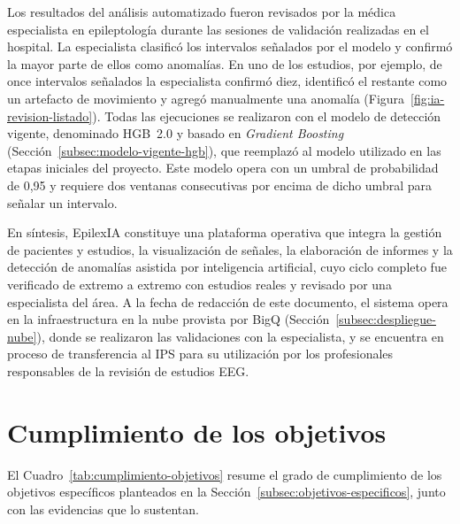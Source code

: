 Los resultados del análisis automatizado fueron revisados por la médica especialista en epileptología durante las sesiones de validación realizadas en el hospital.
La especialista clasificó los intervalos señalados por el modelo y confirmó la mayor parte de ellos como anomalías.
En uno de los estudios, por ejemplo, de once intervalos señalados la especialista confirmó diez, identificó el restante como un artefacto de movimiento y agregó manualmente una anomalía (Figura~\ref{fig:ia-revision-listado}).
Todas las ejecuciones se realizaron con el modelo de detección vigente, denominado HGB~2.0 y basado en \textit{Gradient Boosting} (Sección~\ref{subsec:modelo-vigente-hgb}), que reemplazó al modelo utilizado en las etapas iniciales del proyecto.
Este modelo opera con un umbral de probabilidad de 0,95 y requiere dos ventanas consecutivas por encima de dicho umbral para señalar un intervalo.

En síntesis, EpilexIA constituye una plataforma operativa que integra la gestión de pacientes y estudios, la visualización de señales, la elaboración de informes y la detección de anomalías asistida por inteligencia artificial, cuyo ciclo completo fue verificado de extremo a extremo con estudios reales y revisado por una especialista del área.
A la fecha de redacción de este documento, el sistema opera en la infraestructura en la nube provista por BigQ (Sección~\ref{subsec:despliegue-nube}), donde se realizaron las validaciones con la especialista, y se encuentra en proceso de transferencia al IPS para su utilización por los profesionales responsables de la revisión de estudios EEG.


\section{Cumplimiento de los objetivos}
\label{sec:cumplimiento-objetivos}

El Cuadro~\ref{tab:cumplimiento-objetivos} resume el grado de cumplimiento de los objetivos específicos planteados en la Sección~\ref{subsec:objetivos-especificos}, junto con las evidencias que lo sustentan.

\begingroup
\small
\setlength{\tabcolsep}{4pt}
\renewcommand{\arraystretch}{1.2}

